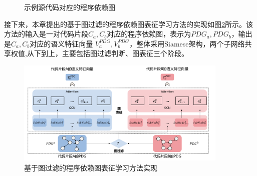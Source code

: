 \begin{figure}[htbp]
  \centering  %
  \caption{示例源代码对应的程序依赖图}    %
  \label{fig:pdgcode}    %
\end{figure}

接下来，本章提出的基于图过滤的程序依赖图表征学习方法的实现如图\ref{fig:pdg}所示。该方法的输入是一对代码片段$C_{a},C_{b}$对应的程序依赖图，表示为$PDG_{a},PDG_{b}$，输出是$C_{a},C_{b}$对应的语义特征向量 $V_{a}^{PDG},V_{b}^{PDG}$，整体采用Siamese架构，两个子网络共享权值,从下到上，主要包括图过滤判断、图表征三个阶段。

\begin{figure}[H]
  \centering
  \includegraphics[width=0.9\textwidth]{figures/pdg.png}
  \caption{基于图过滤的程序依赖图表征学习方法实现}\label{fig:pdg}
\end{figure}

